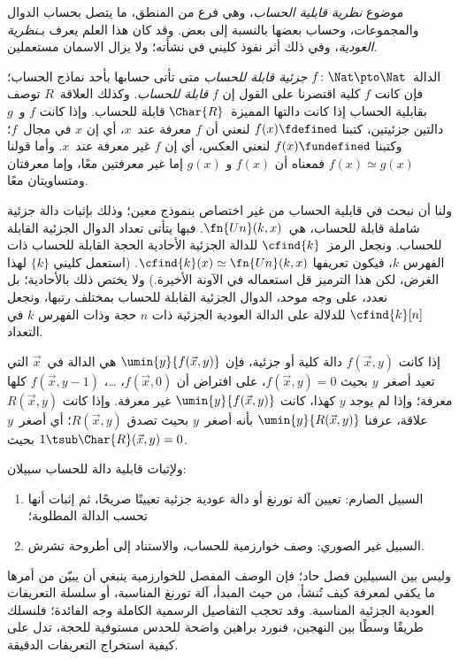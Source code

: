 \documentclass[../../../include/open-logic-section]{subfiles}
\begin{document}

موضوع \emph{نظرية قابلية الحساب}، وهي فرع من المنطق، ما يتصل
بحساب الدوال والمجموعات، وحساب بعضها بالنسبة إلى بعض. وقد كان
هذا العلم يعرف بـ\emph{نظرية العودية}، وفي ذلك أثر نفوذ كليني في نشأته؛
ولا يزال الاسمان مستعملين.

الدالة~$f\colon\Nat\pto\Nat$ \emph{جزئية قابلة للحساب} متى تأتى
حسابها بأحد نماذج الحساب؛ فإن كانت $f$ كلية اقتصرنا على القول إن
$f$ \emph{قابلة للحساب}. وكذلك العلاقة~$R$ توصف بقابلية الحساب إذا كانت دالتها
المميزة~$\Char{R}$ قابلة للحساب. وإذا كانت $f$ و~$g$ دالتين
جزئيتين، كتبنا $f(x)\fdefined$ لنعني أن $f$ معرفة عند~$x$، أي إن
$x$ في مجال~$f$؛ وكتبنا $f(x)\fundefined$ لنعني العكس، أي إن $f$
غير معرفة عند~$x$. وأما قولنا $f(x)\simeq g(x)$ فمعناه أن $f(x)$ و
$g(x)$ إما غير معرفتين معًا، وإما معرفتان ومتساويتان معًا.

ولنا أن نبحث في قابلية الحساب من غير اختصاص بنموذج
معين؛ وذلك بإثبات دالة جزئية شاملة قابلة للحساب،
هي~$\fn{Un}(k,x)$. فبها يتأتى تعداد الدوال الجزئية القابلة للحساب.
ونجعل الرمز~$\cfind{k}$ للدالة الجزئية الأحادية الحجة
القابلة للحساب ذات الفهرس $k$، فيكون تعريفها
$\cfind{k}(x)\simeq\fn{Un}(k,x)$. (استعمل كليني $\{k\}$ لهذا الغرض،
لكن هذا الترميز قل استعماله في الآونة الأخيرة.) ولا يختص ذلك بالأحادية؛
بل نعدد، على وجه موحد، الدوال الجزئية القابلة للحساب بمختلف
رتبها، ونجعل $\cfind{k}[n]$ للدلالة على الدالة العودية الجزئية
ذات $n$ حجة وذات الفهرس $k$ في التعداد.

إذا كانت $f(\vec x,y)$ دالة كلية أو جزئية، فإن
$\umin{y}{f(\vec x,y)}$ هي الدالة في~$\vec x$ التي تعيد أصغر~$y$
بحيث $f(\vec x,y)=0$، على افتراض أن $f(\vec x,0)$، …،
$f(\vec x,y-1)$ كلها معرفة؛ وإذا لم يوجد $y$ كهذا، كانت
$\umin{y}{f(\vec x,y)}$ غير معرفة. وإذا كانت $R(\vec x,y)$ علاقة،
عرفنا $\umin{y}{R(\vec x,y)}$ بأنه أصغر~$y$ بحيث تصدق
$R(\vec x,y)$؛ أي أصغر~$y$ بحيث $1\tsub\Char{R}(\vec x,y)=0$.

ولإثبات قابلية دالة للحساب سبيلان:
\begin{enumerate}
\item السبيل الصارم: تعيين آلة تورنغ أو دالة عودية جزئية تعيينًا صريحًا،
  ثم إثبات أنها تحسب الدالة المطلوبة؛
\item السبيل غير الصوري: وصف خوارزمية للحساب، والاستناد إلى أطروحة تشرش.
\end{enumerate}
وليس بين السبيلين فصل حاد؛ فإن الوصف المفصل للخوارزمية ينبغي أن يبيّن
من أمرها ما يكفي لمعرفة كيف تُنشأ، من حيث المبدأ، آلة
تورنغ المناسبة، أو سلسلة التعريفات العودية الجزئية المناسبة. وقد تحجب
التفاصيل الرسمية الكاملة وجه الفائدة؛ فلنسلك طريقًا وسطًا بين
النهجين، فنورد براهين واضحة للحدس مستوفية للحجة، تدل على كيفية استخراج
التعريفات الدقيقة.
\end{document}
